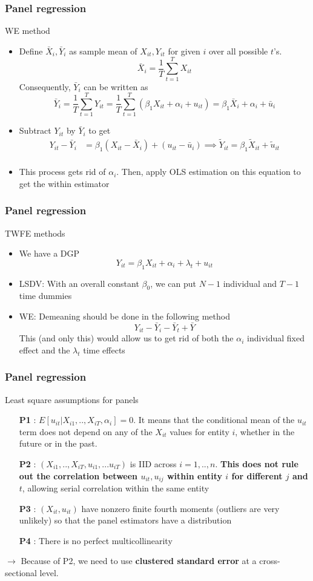 \documentclass[compress]{beamer}
\begin{document}
\begin{frame}
\frametitle{Panel regression}
WE method
\begin{itemize}
\item Define $\bar{X}_i, \bar{Y}_i$ as sample mean of $X_{it}, Y_{it}$ for given $i$ over all possible $t$'s. 
\[
\bar{X}_i = \frac{1}{T}\sum_{t=1}^TX_{it}
\]
Consequently, $\bar{Y}_i$ can be written as
\[
\bar{Y}_i = \frac{1}{T}\sum_{t=1}^TY_{it}=\frac{1}{T}\sum_{t=1}^T\left(\beta_1 X_{it} +\alpha_i +u_{it}\right)=\beta_1 \bar{X}_i +\alpha_i + \bar{u}_{i}
\]
\item Subtract $Y_{it}$ by $\bar{Y}_i$ to get
\[
\begin{aligned}
Y_{it}-\bar{Y}_i &= \beta_1(X_{it}-\bar{X}_i) + (u_{it}-\bar{u}_i) \implies \tilde{Y}_{it}= \beta_1 \tilde{X}_{it}+\tilde{u}_{it}\\
\end{aligned}
\]
\item This process gets rid of $\alpha_i$. Then, apply OLS estimation on this equation to get the within estimator
\end{itemize}
\end{frame}


\begin{frame}
\frametitle{Panel regression}
TWFE methods
\begin{itemize}
\item We have a DGP
\[
Y_{it}=\beta_1 X_{it} + \alpha_i +\lambda_t + u_{it}
\]
\item LSDV: With an overall constant $\beta_0$, we can put $N-1$ individual and $T-1$ time dummies
\item WE: Demeaning should be done in the following method
\[
Y_{it}-\bar{Y}_i -\bar{Y}_t +\bar{Y}
\]
This (and only this) would allow us to get rid of both the $\alpha_i$ individual fixed effect and the $\lambda_t$ time effects
\end{itemize}
\end{frame}


\begin{frame}
\frametitle{Panel regression}
Least square assumptions for panels
\begin{itemize}
\item  [\textbf{P1}]: $E[u_{it}|X_{i1},..,X_{iT},\alpha_i]=0$. It means that the conditional mean of the $u_{it}$ term does not depend on any of the $X_{it}$ values for entity $i$, whether in the future or in the past. 
\item [\textbf{P2}]: $(X_{i1},..,X_{iT},u_{i1},...u_{iT})$ is IID across $i=1,..,n$. \textbf{This does not rule out the correlation between $u_{it},u_{ij}$ within entity $i$ for different $j$ and $t$}, allowing serial correlation within the same entity
 \item[\textbf{P3}]: $(X_{it},u_{it})$ have nonzero finite fourth moments (outliers are very unlikely) so that the panel estimators have a distribution
\item [\textbf{P4}]: There is no perfect multicollinearity
\end{itemize}
$\to$ Because of P2, we need to use \textbf{clustered standard error} at a cross-sectional level.
\end{frame}

\end{document}
